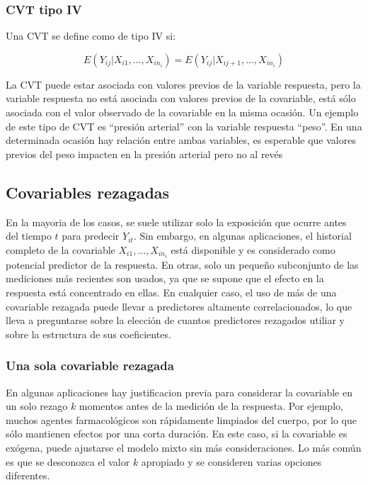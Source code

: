 \documentclass[spanish]{article}
\numberwithin{figure}{subsection}
\numberwithin{equation}{subsection}
\numberwithin{table}{subsection}
\def\xseqn{$X_{i1}, ..., X_{in_i}$}
\begin{document}
\subsubsection{CVT tipo IV}

Una CVT se define como de tipo IV si:

\begin{equation}
	\label{CVT tipo IV}
	E(Y_{ij}|X_{i1}, ..., X_{in_i}) = E(Y_{ij}|X_{ij+1}, ..., X_{in_i})
\end{equation}

La CVT puede estar asociada con valores previos de la variable respuesta, pero
la variable respuesta no está asociada con valores previos de la covariable,
está sólo asociada con el valor observado de la covariable en la misma ocasión.
Un ejemplo de este tipo de CVT es ``presión arterial'' con la variable
respuesta ``peso''. En una determinada ocasión hay relación entre ambas
variables, es esperable que valores previos del peso impacten en la presión
arterial pero no al revés

\subsection{Covariables rezagadas}

En la mayoria de los casos, se suele utilizar solo la exposición que ocurre
antes del tiempo $t$ para predecir $Y_{it}$. Sin embargo, en algunas
aplicaciones, el historial completo de la covariable \xseqn{} está disponible y
es considerado como potencial predictor de la respuesta. En otras, solo un
pequeño subconjunto de las mediciones más recientes son usados, ya que se
supone que el efecto en la respuesta está concentrado en ellas. En cualquier
caso, el uso de más de una covariable rezagada puede llevar a predictores
altamente correlacionados, lo que lleva a preguntarse sobre la elección de
cuantos predictores rezagados utiliar y sobre la estructura de sus
coeficientes.

\subsubsection{Una sola covariable rezagada}

En algunas aplicaciones hay justificacion previa para considerar la covariable
en un solo rezago $k$ momentos antes de la medición de la respuesta. Por
ejemplo, muchos agentes farmacológicos son rápidamente limpiados del cuerpo,
por lo que sólo mantienen efectos por una corta duración. En este caso, si la
covariable es exógena, puede ajustarse el modelo mixto sin más consideraciones.
Lo más común es que se desconozca el valor $k$ apropiado y se consideren varias
opciones diferentes.
\end{document}
